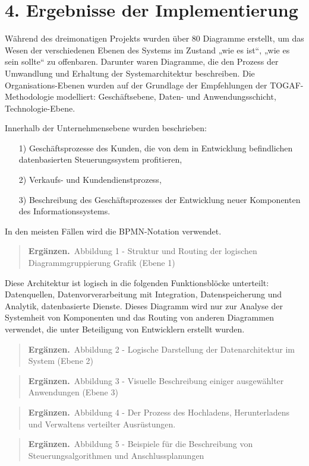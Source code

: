 \documentclass[11pt,a4paper]{article}
\newcommand{\ergaenzen}{\textbf{Ergänzen.}\ }
\begin{document}
\section*{4. Ergebnisse der Implementierung}
Während des dreimonatigen Projekts wurden über 80 Diagramme erstellt, um das
Wesen der verschiedenen Ebenen des Systems im Zustand „wie es ist“, „wie es
sein sollte“ zu offenbaren.  Darunter waren Diagramme, die den Prozess der
Umwandlung und Erhaltung der Systemarchitektur beschreiben. Die
Organisations-Ebenen wurden auf der Grundlage der Empfehlungen der
TOGAF-Methodologie modelliert: Geschäftsebene, Daten- und Anwendungsschicht,
Technologie-Ebene.

Innerhalb der Unternehmensebene wurden beschrieben: 
\begin{itemize}
\item[1)] Geschäftsprozesse des Kunden, die von dem in Entwicklung
  befindlichen datenbasierten Steuerungssystem profitieren,
\item[2)] Verkaufs- und Kundendienstprozess,
\item[3)] Beschreibung des Geschäftsprozesses der Entwicklung neuer
  Komponenten des Informationssystems. 
\end{itemize}
In den meisten Fällen wird die BPMN-Notation verwendet.

\begin{quote}
  \ergaenzen Abbildung 1 - Struktur und Routing der logischen
  Diagrammgruppierung Grafik (Ebene 1)
\end{quote}
Diese Architektur ist logisch in die folgenden Funktionsblöcke unterteilt:
Datenquellen, Datenvorverarbeitung mit Integration, Datenspeicherung und
Analytik, datenbasierte Dienste. Dieses Diagramm wird nur zur Analyse der
Systemheit von Komponenten und das Routing von anderen Diagrammen verwendet,
die unter Beteiligung von Entwicklern erstellt wurden.

\begin{quote}
  \ergaenzen Abbildung 2 - Logische Darstellung der Datenarchitektur im System
  (Ebene 2)
\end{quote}
\begin{quote}
  \ergaenzen Abbildung 3 - Visuelle Beschreibung einiger ausgewählter
  Anwendungen (Ebene 3)
\end{quote}
\begin{quote}
  \ergaenzen Abbildung 4 - Der Prozess des Hochladens, Herunterladens und
  Verwaltens verteilter Ausrüstungen.
\end{quote}
\begin{quote}
  \ergaenzen Abbildung 5 - Beispiele für die Beschreibung von
  Steuerungsalgorithmen und Anschlussplanungen
\end{quote}
\end{document}
